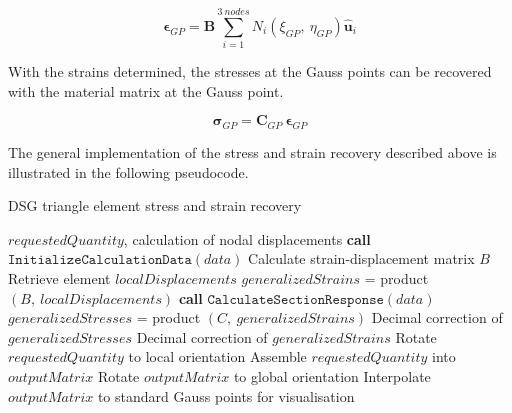 \begin{equation} 
\boldsymbol{\epsilon}_{GP} = \mathbf{B} \sum_{i=1}^{3\ nodes} N_i(\xi_{GP},\ \eta_{GP}) \hat{\mathbf{u}}_i
\label{eqt20}
\end{equation}

With the strains determined, the stresses at the Gauss points can be recovered with the material matrix at the Gauss point.

\begin{equation} 
\boldsymbol{\sigma}_{GP} = \mathbf{C}_{GP}\ \boldsymbol{\epsilon}_{GP}
\label{eqt21}
\end{equation}

The general implementation of the stress and strain recovery described above is illustrated in the following pseudocode.

\begin{algorithm}
	\caption{DSG triangle element stress and strain recovery}
	\label{DSG triangle element stress and strain recovery}
	\begin{algorithmic}[1]
		\Require $requestedQuantity$, calculation of nodal displacements
		\State \textbf{call} $\texttt{InitializeCalculationData}(data)$
		\State \hspace{\algorithmicindent}Calculate strain-displacement matrix $B$
		\State \hspace{\algorithmicindent}Retrieve element $localDisplacements$
		\State $generalizedStrains$ = product$(B,\ localDisplacements)$
				\State \textbf{call} $\texttt{CalculateSectionResponse}(data)$
				\State $generalizedStresses$ = product $(C,\ generalizedStrains)$
				\State Decimal correction of $generalizedStresses$
		\EndIf
		\State Decimal correction of $generalizedStrains$ 
				\State Rotate $requestedQuantity$ to local orientation
		\EndIf
		\State Assemble $requestedQuantity$ into $outputMatrix$
				\State Rotate $outputMatrix$ to global orientation
		\EndIf
		\State Interpolate $outputMatrix$ to standard Gauss points for visualisation
	\end{algorithmic}
\end{algorithm}